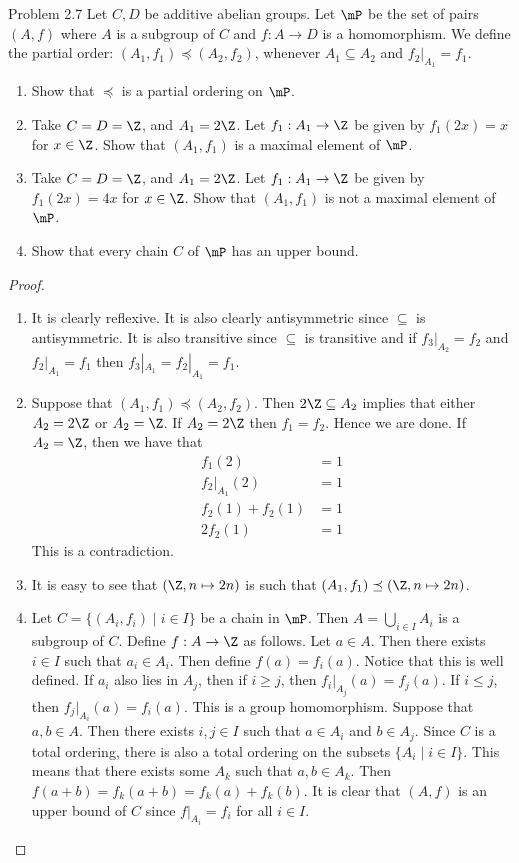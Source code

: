 \documentclass[a4paper]{article}
\begin{document}
\begin{ex}{Problem 2.7}{} Let $C,D$ be additive abelian groups. Let $\mP$ be the set of pairs $(A,f)$ where $A$ is a subgroup of $C$ and $f:A\to D$ is a homomorphism. We define the partial order: $(A_1,f_1)\preceq(A_2,f_2)$, whenever $A_1\subseteq A_2$ and $f_2|_{A_1}=f_1$. 
\begin{enumerate}
\item Show that $\preceq$ is a partial ordering on $\mP$.
\item Take $C=D=\Z$, and $A_1=2\Z$. Let $f_1:A_1\to\Z$ be given by $f_1(2x)=x$ for $x\in\Z$. Show that $(A_1,f_1)$ is a maximal element of $\mP$.
\item Take $C=D=\Z$, and $A_1=2\Z$. Let $f_1:A_1\to\Z$ be given by $f_1(2x)=4x$ for $x\in\Z$. Show that $(A_1,f_1)$ is not a maximal element of $\mP$.
\item Show that every chain $C$ of $\mP$ has an upper bound.
\end{enumerate} \tcbline
\begin{proof}~\\
\begin{enumerate}
\item It is clearly reflexive. It is also clearly antisymmetric since $\subseteq$ is antisymmetric. It is also transitive since $\subseteq$ is transitive and if $f_3|_{A_2}=f_2$ and $f_2|_{A_1}=f_1$ then $f_3|_{A_1}=f_2|_{A_1}=f_1$. 
\item Suppose that $(A_1,f_1)\preceq(A_2,f_2)$. Then $2\Z\subseteq A_2$ implies that either $A_2=2\Z$ or $A_2=\Z$. If $A_2=2\Z$ then $f_1=f_2$. Hence we are done. If $A_2=\Z$, then we have that 
\begin{align*}
f_1(2)&=1\\
f_2|_{A_1}(2)&=1\\
f_2(1)+f_2(1)&=1\\
2f_2(1)&=1
\end{align*}
This is a contradiction. 
\item It is easy to see that $(\Z,n\mapsto 2n)$ is such that $(A_1,f_1)\preceq(\Z,n\mapsto 2n)$. 
\item Let $C=\{(A_i,f_i)\;|\;i\in I\}$ be a chain in $\mP$. Then $A=\bigcup_{i\in I}A_i$ is a subgroup of $C$. Define $f:A\to\Z$ as follows. Let $a\in A$. Then there exists $i\in I$ such that $a_i\in A_i$. Then define $f(a)=f_i(a)$. Notice that this is well defined. If $a_i$ also lies in $A_j$, then if $i\geq j$, then $f_i|_{A_j}(a)=f_j(a)$. If $i\leq j$, then $f_j|_{A_i}(a)=f_i(a)$. This is a group homomorphism. Suppose that $a,b\in A$. Then there exists $i,j\in I$ such that $a\in A_i$ and $b\in A_j$. Since $C$ is a total ordering, there is also a total ordering on the subsets $\{A_i\;|\;i\in I\}$. This means that there exists some $A_k$ such that $a,b\in A_k$. Then $f(a+b)=f_k(a+b)=f_k(a)+f_k(b)$. It is clear that $(A,f)$ is an upper bound of $C$ since $f|_{A_i}=f_i$ for all $i\in I$. 
\end{enumerate}
\end{proof}
\end{ex}
\end{document}
